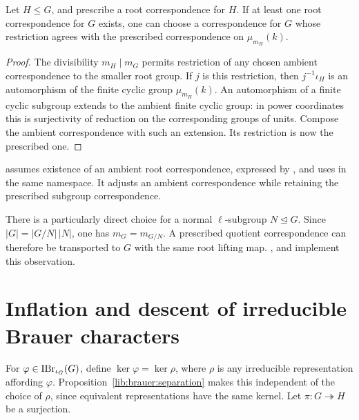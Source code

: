 \begin{proposition}
\label{lib:brauer:root-reselection}
Let $H\leq G$, and prescribe a root correspondence for $H$. If at least
one root correspondence for $G$ exists, one can choose a correspondence
for $G$ whose restriction agrees with the prescribed correspondence
on $\mu_{m_H}(k)$.
\end{proposition}
\begin{proof}
The divisibility $m_H\mid m_G$ permits restriction of any chosen ambient
correspondence to the smaller root group. If $j$ is this restriction, then
$j^{-1}\iota_H$ is an automorphism of the finite cyclic group
$\mu_{m_H}(k)$. An automorphism of a finite cyclic subgroup extends
to the ambient finite cyclic group: in power coordinates this is
surjectivity of reduction on the corresponding groups of units.
Compose the ambient correspondence with such an extension. Its
restriction is now the prescribed one.
\end{proof}

\begin{implementation}
assumes existence of an ambient root correspondence, expressed by
, and uses
 in the same namespace. It adjusts an
ambient correspondence while retaining the prescribed subgroup correspondence.
\end{implementation}

There is a particularly direct choice for a normal $\ell$-subgroup
$N\trianglelefteq G$. Since $|G|=|G/N|\,|N|$, one has
$m_G=m_{G/N}$. A prescribed quotient correspondence can therefore be
transported to $G$ with the same root lifting map.
,
 and  implement this observation.

\section{Inflation and descent of irreducible Brauer characters}
\label{lib:brauer:descent}

For $\varphi\in\operatorname{IBr}_{\iota_G}(G)$, define $\ker\varphi=\ker\rho$,
where $\rho$ is any irreducible representation affording $\varphi$.
Proposition~\ref{lib:brauer:separation} makes this independent of the
choice of $\rho$, since equivalent representations have the same kernel.
Let $\pi:G\twoheadrightarrow H$ be a surjection.

